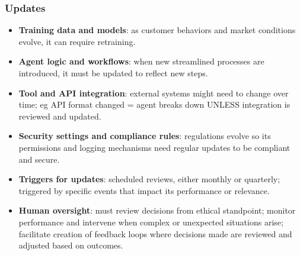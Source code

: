 \documentclass[12pt, letterpaper]{article}
\begin{document}
\subsubsection{Updates}
\begin{itemize}
    \item \textbf{Training data and models}: as customer behaviors and market conditions evolve, it can require retraining.
    \item \textbf{Agent logic and workflows}: when new streamlined processes are introduced, it must be updated to reflect new steps.
    \item \textbf{Tool and API integration}: external systems might need to change over time; eg API format changed = agent breaks down UNLESS integration is reviewed and updated.
    \item \textbf{Security settings and compliance rules}: regulations evolve so its permissions and logging mechanisms need regular updates to be compliant and secure.
    \item \textbf{Triggers for updates}: scheduled reviews, either monthly or quarterly; triggered by specific events that impact its performance or relevance.
    \item \textbf{Human oversight}: must review decisions from ethical standpoint; monitor performance and intervene when complex or unexpected situations arise; facilitate creation of feedback loops where decisions made are reviewed and adjusted based on outcomes. 
\end{itemize}
\end{document}
